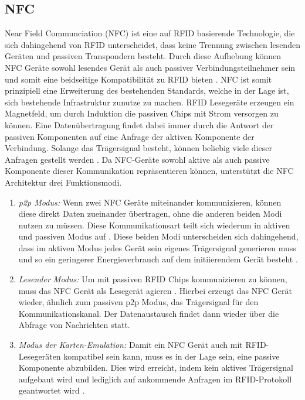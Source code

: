 	\subsection{NFC}
	Near Field Communciation (NFC) ist eine auf RFID basierende Technologie, die sich dahingehend von RFID unterscheidet, dass keine Trennung zwischen lesenden Geräten und passiven Transpondern besteht. Durch diese Aufhebung können NFC Geräte sowohl lesendes Gerät als auch passiver Verbindungsteilnehmer sein und somit eine beidseitige Kompatibilität zu RFID bieten \cite[S.6]{Langer}. NFC ist somit prinzipiell eine Erweiterung des bestehenden Standards, welche in der Lage ist, sich bestehende Infrastruktur zunutze zu machen.
	RFID Lesegeräte erzeugen ein Magnetfeld, um durch Induktion die passiven Chips mit Strom versorgen zu können. Eine Datenübertragung findet dabei immer durch die Antwort der passiven Komponenten auf eine Anfrage der aktiven Komponente der Verbindung. Solange das Trägersignal besteht, können beliebig viele dieser Anfragen gestellt werden \cite[S.89]{Langer}.
	Da NFC-Geräte sowohl aktive als auch passive Komponente dieser Kommunikation repräsentieren können, unterstützt die NFC Architektur drei Funktionsmodi.
	\begin{enumerate}
		\item {\it p2p Modus:} Wenn zwei NFC Geräte miteinander kommunizieren, können diese direkt Daten zueinander übertragen, ohne die anderen beiden Modi nutzen zu müssen. Diese Kommunikationsart teilt sich wiederum in aktiven und passiven Modus auf \cite[S.91]{Langer}. Diese beiden Modi unterscheiden sich dahingehend, dass im aktiven Modus jedes Gerät sein eigenes Trägersignal generieren muss und so ein geringerer Energieverbrauch auf dem initiierendem Gerät besteht \cite[S.94]{Langer}.
		
		\item {\it Lesender Modus:} Um mit passiven RFID Chips kommunizieren zu können, muss das NFC Gerät als Lesegerät agieren \cite[S.99]{Langer}. Hierbei erzeugt das NFC Gerät wieder, ähnlich zum passiven p2p Modus, das Trägersignal für den Kommunikationskanal. Der Datenaustausch findet dann wieder über die Abfrage von Nachrichten statt.
		\item {\it Modus der Karten-Emulation:} Damit ein NFC Gerät auch mit RFID-Lesegeräten kompatibel sein kann, muss es in der Lage sein, eine passive Komponente abzubilden. Dies wird erreicht, indem kein aktives Trägersignal aufgebaut wird und lediglich auf ankommende Anfragen im RFID-Protokoll geantwortet wird \cite[S.100]{Langer}.
	\end{enumerate}
	
